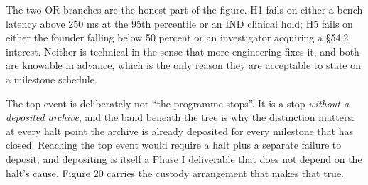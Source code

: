 The two OR branches are the honest part of the figure. H1 fails on either a
bench latency above 250 ms at the 95th percentile or an IND clinical hold; H5
fails on either the founder falling below 50 percent or an investigator
acquiring a \S54.2 interest. Neither is technical in the sense that more
engineering fixes it, and both are knowable in advance, which is the only reason
they are acceptable to state on a milestone schedule.

The top event is deliberately not ``the programme stops''. It is a stop
\emph{without a deposited archive}, and the band beneath the tree is why the
distinction matters: at every halt point the archive is already deposited for
every milestone that has closed. Reaching the top event would require a halt
plus a separate failure to deposit, and depositing is itself a Phase I
deliverable that does not depend on the halt's cause. Figure 20 carries the
custody arrangement that makes that true.
